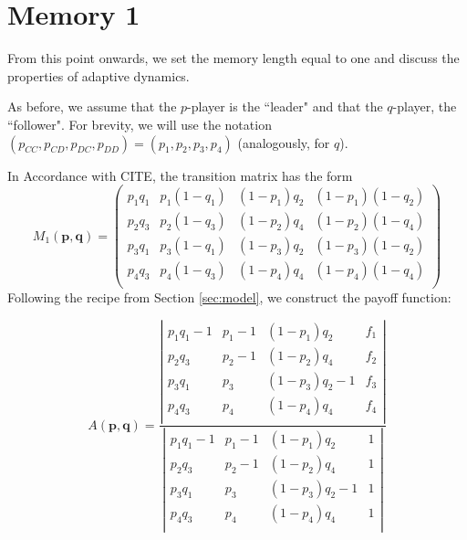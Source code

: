 \documentclass{article}
\def\p{\mathbf{p}}
\def\q{\mathbf{q}}
\theoremstyle{definition}
\numberwithin{equation}{section}
\begin{document}
\section{Memory 1}
\label{sec: memory 1}
From this point onwards, we set the memory length equal to one and discuss the properties of adaptive dynamics. 

As before, we assume that the $p$-player is the ``leader" and that the $q$-player, the  ``follower". For brevity, we will use the notation $(p_{CC}, p_{CD},p_{DC},p_{DD}) = (p_1,p_2, p_3, p_4)$ (analogously, for $q$). 

In Accordance with CITE, the  transition matrix  has the form
\begin{equation}
    \label{eq: matri memory 1}
   M_1(\p,\q) =  \left(
\begin{array}{cccc}
 p_1 q_1 & p_1 (1-q_1) & (1-p_1) q_2 & (1-p_1) (1-q_2) \\
 p_2 q_3 & p_2 (1-q_3) & (1-p_2) q_4 & (1-p_2) (1-q_4) \\
 p_3 q_1 & p_3 (1-q_1) & (1-p_3) q_2 & (1-p_3) (1-q_2) \\
 p_4 q_3 & p_4 (1-q_3) & (1-p_4) q_4 & (1-p_4) (1-q_4) \\
\end{array}
\right)
\end{equation}
Following the recipe from Section \ref{sec:model}, we construct the payoff function:
\begin{small}
   \begin{equation}
  A(\mathbf{p},\mathbf{q}) =      \frac{\left| 
\begin{array}{cccc}
 p_1 q_1-1 & p_1-1 & (1-p_1) q_2 & f_1 \\
 p_2 q_3 & p_2-1 & (1-p_2) q_4 & f_2 \\
 p_3 q_1 & p_3 & (1-p_3) q_2-1 & f_3 \\
 p_4 q_3 & p_4 & (1-p_4) q_4 & f_4 \\
\end{array}
\right| }{\left| 
\begin{array}{cccc}
 p_1 q_1-1 & p_1-1 & (1-p_1) q_2 & 1 \\
 p_2 q_3 & p_2-1 & (1-p_2) q_4 & 1 \\
 p_3 q_1 & p_3 & (1-p_3) q_2-1 & 1 \\
 p_4 q_3 & p_4 & (1-p_4) q_4 & 1 \\
\end{array}
\right| }
   \end{equation}
\end{small}
\end{document}
